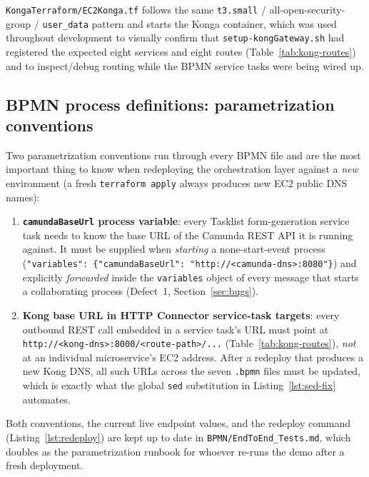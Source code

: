 \documentclass[11pt,a4paper]{article}
\begin{document}
\texttt{KongaTerraform/EC2Konga.tf} follows the same \texttt{t3.small} /
all-open-security-group / \texttt{user\_data} pattern and starts the Konga
container, which was used throughout development to visually confirm that
\texttt{setup-kongGateway.sh} had registered the expected eight services and
eight routes (Table~\ref{tab:kong-routes}) and to inspect/debug routing while
the BPMN service tasks were being wired up.
 
\subsection{BPMN process definitions: parametrization conventions}
 
Two parametrization conventions run through every BPMN file and are the most
important thing to know when redeploying the orchestration layer against a
\emph{new} environment (a fresh \texttt{terraform apply} always produces new
EC2 public DNS names):
 
\begin{enumerate} \item \textbf{\texttt{camundaBaseUrl} process variable}: every Tasklist form-generation service task needs to know the base URL of the Camunda REST API it is running against. It must be supplied when \emph{starting} a none-start-event process (\texttt{"variables": \{"camundaBaseUrl": "http://<camunda-dns>:8080"\}}) and explicitly \emph{forwarded} inside the \texttt{variables} object of every message that starts a collaborating process (Defect~1, Section~\ref{sec:bugs}). \item \textbf{Kong base URL in HTTP Connector service-task targets}: every outbound REST call embedded in a service task's URL must point at \texttt{http://<kong-dns>:8000/<route-path>/...} (Table~\ref{tab:kong-routes}), \emph{not} at an individual microservice's EC2 address. After a redeploy that produces a new Kong DNS, all such URLs across the seven \texttt{.bpmn} files must be updated, which is exactly what the global \texttt{sed} substitution in Listing~\ref{lst:sed-fix} automates.
\end{enumerate}
 
\noindent
Both conventions, the current live endpoint values, and the redeploy command
(Listing~\ref{lst:redeploy}) are kept up to date in
\texttt{BPMN/EndToEnd\_Tests.md}, which doubles as the
parametrization runbook for whoever re-runs the demo after a fresh deployment.
 
\end{document}
